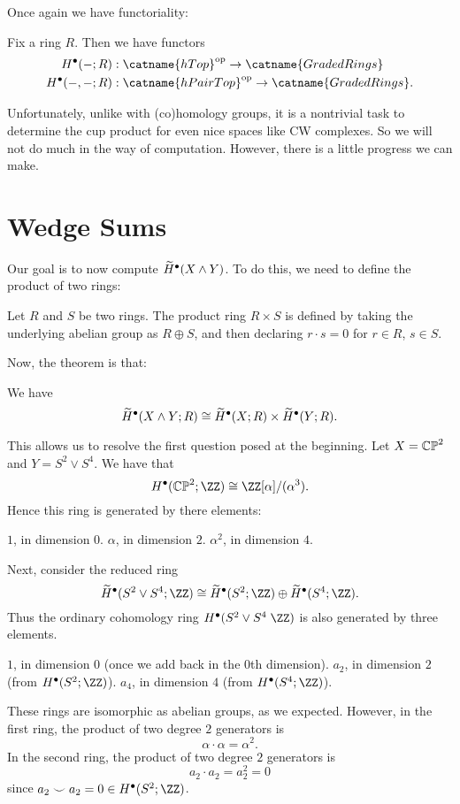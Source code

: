 Once again we have functoriality:
\begin{theorem}
	Fix a ring $R$.
	Then we have functors
	\begin{align*}
		H^\bullet(-; R) &: \catname{hTop}\op \to \catname{GradedRings} \\
		H^\bullet(-,-; R) &: \catname{hPairTop}\op \to \catname{GradedRings}.
	\end{align*}
\end{theorem}

Unfortunately, unlike with (co)homology groups,
it is a nontrivial task to determine the cup product
for even nice spaces like CW complexes.
So we will not do much in the way of computation.
However, there is a little progress we can make.

\section{Wedge Sums}

Our goal is to now compute $\widetilde H^\bullet(X \wedge Y)$.
To do this, we need to define the product of two rings:
\begin{definition}
	Let $R$ and $S$ be two rings.
	The product ring $R \times S$ is defined by
	taking the underlying abelian group as $R \oplus S$,
	and then declaring $r \cdot s = 0$ for $r \in R$, $s \in S$.
\end{definition}

Now, the theorem is that:
\begin{theorem}
	We have
	\[
		\widetilde H^\bullet(X \wedge Y; R)
		\cong \widetilde H^\bullet(X;R)
		\times \widetilde H^\bullet(Y;R).
	\]
\end{theorem}

This allows us to resolve the first question posed at the beginning.
Let $X = \mathbb{CP}^2$ and $Y = S^2 \vee S^4$.
We have that
\[ H^\bullet(\CP^2; \ZZ) \cong \ZZ[\alpha] / (\alpha^3). \]
Hence this ring is generated by there elements:
\begin{itemize}
	\ii $1$, in dimension $0$.
	\ii $\alpha$, in dimension $2$.
	\ii $\alpha^2$, in dimension $4$.
\end{itemize}
Next, consider the reduced ring
\[ \wt H^\bullet(S^2 \vee S^4; \ZZ) \cong
	\wt H^\bullet(S^2; \ZZ)
	\oplus \wt H^\bullet(S^4 ; \ZZ).
\]
Thus the ordinary cohomology ring $H^\bullet(S^2 \vee S^4 \; \ZZ)$
is also generated by three elements.
\begin{itemize}
	\ii $1$, in dimension $0$ (once we add back in the $0$th dimension).
	\ii $a_2$, in dimension $2$ (from $H^\bullet(S^2 ; \ZZ)$).
	\ii $a_4$, in dimension $4$ (from $H^\bullet(S^4 ; \ZZ)$).
\end{itemize}
These rings are isomorphic as abelian groups, as we expected.
However, in the first ring, the product of two degree $2$ generators is
\[ \alpha \cdot \alpha = \alpha^2. \]
In the second ring, the product of two degree $2$ generators is
\[ a_2 \cdot a_2 = a_2^2 = 0 \]
since $a_2 \smile a_2 = 0 \in H^\bullet(S^2; \ZZ)$.

